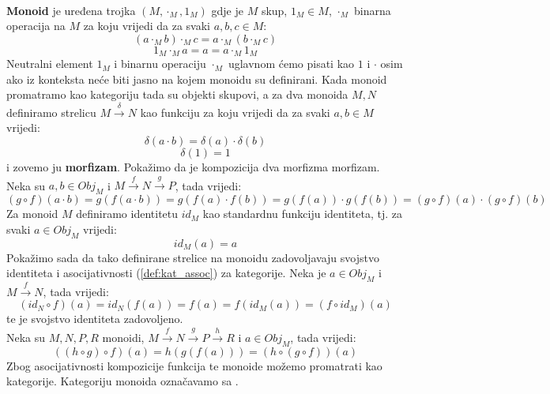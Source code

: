   \begin{example}\ \\
   
    \noindent \textbf{Monoid} je uređena trojka $(M, \cdot_M, 1_M)$ gdje je $M$ skup, $1_M
    \in M$, $\cdot_M$ binarna operacija na $M$ za koju vrijedi da za svaki $a, b, c \in M$:
    \begin{equation*}
      (a \cdot_M b) \cdot_M c = a \cdot_M (b \cdot_M c)
    \end{equation*}
    \begin{equation*}
      1_M \cdot_M a = a = a \cdot_M 1_M
    \end{equation*}
    Neutralni element $1_M$ i binarnu operaciju $\cdot_M$ uglavnom ćemo pisati
    kao $1$ i $\cdot$ osim ako iz konteksta neće biti jasno na kojem monoidu
    su definirani.
    Kada monoid promatramo kao kategoriju tada su objekti skupovi, a
    za dva monoida $M, N$ definiramo strelicu $M \xrightarrow{\delta} N$ kao
    funkciju za koju vrijedi da za svaki $a, b \in M$ vrijedi:
    \begin{equation*}
      \delta(a \cdot b) = \delta(a) \cdot \delta(b)
    \end{equation*}
    \begin{equation*}
      \delta(1) = 1
    \end{equation*}
    i zovemo ju \textbf{morfizam}.
    Pokažimo da je kompozicija dva morfizma morfizam.
    Neka su $a, b \in Obj_M$ i $M \xrightarrow{f} N \xrightarrow{g} P$, tada vrijedi:
    \begin{equation*}
      (g \circ f)(a \cdot b) = g(f(a \cdot b)) = g(f(a) \cdot f(b)) = g(f(a))
      \cdot g(f(b)) = (g \circ f)(a) \cdot (g \circ f)(b)
    \end{equation*}
    Za monoid $M$ definiramo identitetu $id_M$ kao standardnu funkciju
    identiteta, tj. za svaki $a \in Obj_M$ vrijedi:
    \begin{equation*}
      id_M(a) = a
    \end{equation*}
    Pokažimo sada da tako definirane strelice na monoidu zadovoljavaju
    svojstvo identiteta i asocijativnosti (\ref{def:kat_assoc}) za kategorije.
    Neka je $a \in Obj_M$ i $M \xrightarrow{f} N$, tada vrijedi:
    \begin{equation*}
      (id_N \circ f)(a) = id_N(f(a)) = f(a) = f(id_M(a)) = (f \circ id_M)(a)
    \end{equation*}
    te je svojstvo identiteta zadovoljeno.\\
    Neka su $M, N, P, R$ monoidi, $M \xrightarrow{f} N \xrightarrow{g} P \xrightarrow{h} R$
    i $a \in Obj_M$, tada vrijedi:
    \begin{equation*}
      ((h \circ g) \circ f)(a) = h(g(f(a))) = (h \circ (g \circ f))(a)
    \end{equation*}
    Zbog asocijativnosti kompozicije funkcija te monoide možemo promatrati kao
    kategorije. Kategoriju monoida označavamo sa .
  
  \end{example}

